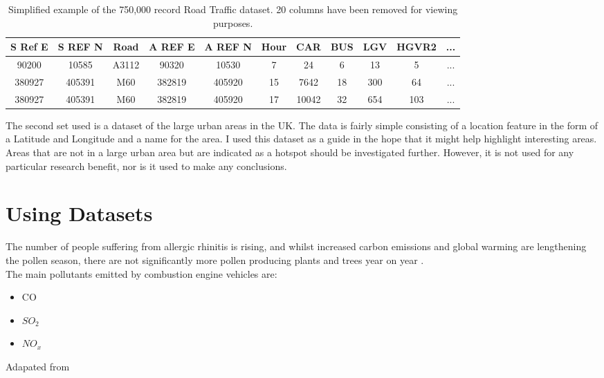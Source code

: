 \begin{table}[H]
\begin{center}
\begin{tabular}{|c|c|c|c|c|c|c|c|c|c|c|}\hline\hline
S Ref E&S REF N&Road&A REF E&A REF N&Hour&CAR&BUS&LGV&HGVR2&...\\\hline
90200&10585&A3112&90320&10530&7&24&6&13&5&...\\
380927&405391&M60&382819&405920&15&7642&18&300&64&...\\
380927&405391&M60&382819&405920&17&10042&32&654&103&...\\\hline\hline
\end{tabular}
\caption{Simplified example of the 750,000 record Road Traffic dataset. 20 columns have been removed for viewing purposes.}\label{RoadTrafficData}
\end{center}
\end{table}

The second set used is a dataset of the large urban areas in the UK. The data is fairly simple consisting of a location feature in the form of a Latitude and Longitude and a name for the area. I used this dataset as a guide in the hope that it might help highlight interesting areas. Areas that are not in a large urban area but are indicated as a hotspot should be investigated further. However, it is not used for any particular research benefit, nor is it used to make any conclusions.\\

\section{Using Datasets}

The number of people suffering from allergic rhinitis is rising, and whilst increased carbon emissions and global warming are lengthening the pollen season, there are not significantly more pollen producing plants and trees year on year \cite{co2pollen, allergyrising}.\\

The main pollutants emitted by combustion engine vehicles are:

\begin{itemize}
    \item CO
    \item $SO_2$
    \item $NO_x$
\end{itemize}

\begin{center}
Adapated from \cite{vehcemis}
\end{center}

